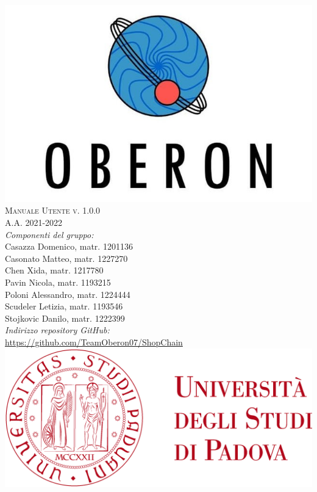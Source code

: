 \begin{titlepage}
	\begin{center}
		
		\includegraphics[scale = 0.2]{img/logo-cut.jpg}\\[1cm]
		\Huge \textsc{Manuale Utente v. 1.0.0}\\ [0.75cm]                          
		\Large \textsf{A.A. 2021-2022} \\ [1cm]

		\Large \textsl{Componenti del gruppo:} \\[0.25cm] \textsf{Casazza Domenico, matr. 1201136} \\ [0.1cm]
		\Large \textsf{Casonato Matteo, matr. 1227270} \\ [0.1cm]
		\Large \textsf{Chen Xida, matr. 1217780} \\ [0.1cm]
		\Large \textsf{Pavin Nicola, matr. 1193215} \\ [0.1cm]
		\Large \textsf{Poloni Alessandro, matr. 1224444} \\ [0.1cm]
		\Large \textsf{Scudeler Letizia, matr. 1193546} \\ [0.1cm]
		\Large \textsf{Stojkovic Danilo, matr. 1222399} \\ [1cm]
		                
		\Large \textsl{Indirizzo repository GitHub:} \\ \textsf{\href{https://github.com/TeamOberon07/ShopChain}{https://github.com/TeamOberon07/ShopChain}}\\[0.5cm]

		\includegraphics[scale = 0.055]{img/logo-unipd.png}

	\end{center}
\end{titlepage}